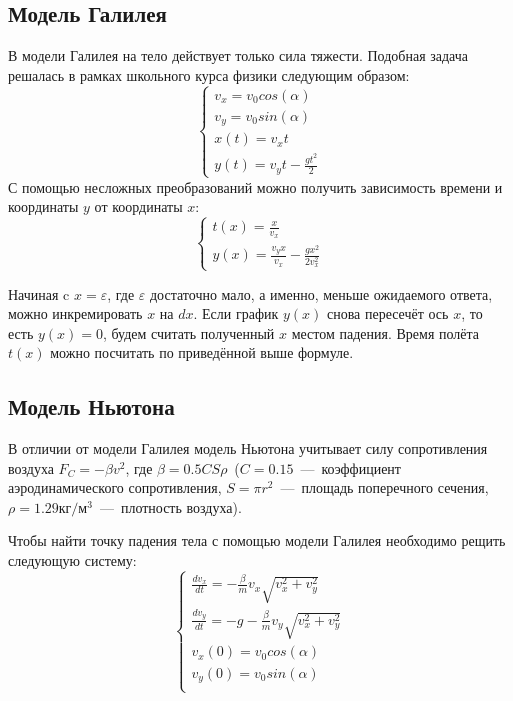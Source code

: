 \documentclass[12pt,a4paper,oneside]{extarticle}
\begin{document}
    \subsection{Модель Галилея}
        В модели Галилея на тело действует только сила тяжести. Подобная задача решалась в рамках школьного курса физики следующим образом:
        \begin{equation*}
            \begin{cases}
                v_x = v_0cos(\alpha) \\
                v_y = v_0sin(\alpha) \\
                x(t)=v_xt \\
                y(t)=v_yt - \frac{gt^2}{2}
            \end{cases}
        \end{equation*}
        С помощью несложных преобразований можно получить зависимость времени и координаты $y$ от координаты $x$:
        \begin{equation*}
            \begin{cases}
                t(x) = \frac{x}{v_x} \\
                y(x) = \frac{v_y x}{v_x} - \frac{gx^2}{2v_x^2}
            \end{cases}
        \end{equation*}

        Начиная c $x=\varepsilon$, где $\varepsilon$ достаточно мало, а именно, меньше ожидаемого ответа, можно инкремировать $x$ на $dx$. Если график $y(x)$ снова пересечёт ось $x$, то есть $y(x)=0$, будем считать полученный $x$ местом падения. Время полёта $t(x)$ можно посчитать по приведённой выше формуле.

    \subsection{Модель Ньютона}
        В отличии от модели Галилея модель Ньютона учитывает силу сопротивления воздуха $F_C = -\beta v^2$, где $\beta=0.5CS\rho$~($C=0.15$~---~коэффициент аэродинамического сопротивления, $S=\pi r^2$~---~площадь поперечного сечения, $\rho=1.29$кг$/$м$^3$~---~плотность воздуха).

        Чтобы найти точку падения тела с помощью модели Галилея необходимо рещить следующую систему:
        \begin{equation*}
            \begin{cases}
                \frac{d v_x}{dt} = -\frac{\beta}{m}v_x \sqrt{v_x^2+v_y^2} \\
                \frac{d v_y}{dt} = -g-\frac{\beta}{m}v_y \sqrt{v_x^2+v_y^2} \\
                v_x(0) = v_0cos(\alpha) \\
                v_y(0) = v_0sin(\alpha) \\
            \end{cases}
        \end{equation*}
        
\end{document}

